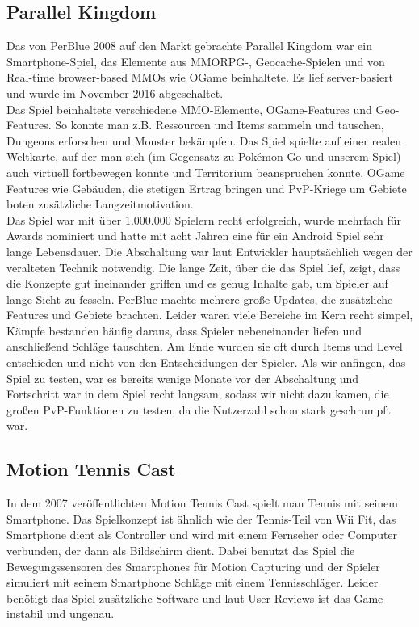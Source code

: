 \documentclass[extern,palatino]{cgBA}
\begin{document}
\subsection{Parallel Kingdom}
Das von PerBlue 2008 auf den Markt gebrachte Parallel Kingdom war ein Smartphone-Spiel, das Elemente aus MMORPG-, Geocache-Spielen und von Real-time browser-based MMOs wie OGame beinhaltete. Es lief server-basiert und wurde im November 2016 abgeschaltet. %
\\Das Spiel beinhaltete verschiedene MMO-Elemente, OGame-Features und Geo-Features. So konnte man z.B. Ressourcen und Items sammeln und tauschen, Dungeons erforschen und Monster bekämpfen. Das Spiel spielte  auf einer realen Weltkarte, auf der man sich (im Gegensatz zu Pokémon Go und unserem Spiel) auch virtuell fortbewegen konnte und Territorium beanspruchen konnte. OGame Features wie Gebäuden, die stetigen Ertrag bringen und PvP-Kriege um Gebiete boten zusätzliche Langzeitmotivation.
\\Das Spiel war mit über 1.000.000 Spielern recht erfolgreich, wurde mehrfach für Awards nominiert und hatte mit acht Jahren eine für ein Android Spiel sehr lange Lebensdauer.  %
Die Abschaltung war laut Entwickler hauptsächlich wegen der veralteten Technik notwendig. %
Die lange Zeit, über die das Spiel lief, zeigt, dass die Konzepte gut ineinander griffen und es genug Inhalte gab, um Spieler auf lange Sicht zu fesseln. PerBlue machte mehrere große Updates, die zusätzliche Features und Gebiete brachten. Leider waren viele Bereiche im Kern recht simpel, Kämpfe bestanden häufig daraus, dass Spieler nebeneinander liefen und anschließend Schläge tauschten. Am Ende wurden sie oft durch Items und Level entschieden und nicht von den Entscheidungen der Spieler. Als wir anfingen, das Spiel zu testen, war es bereits wenige Monate vor der Abschaltung und Fortschritt war in dem Spiel recht langsam, sodass wir nicht dazu kamen, die großen PvP-Funktionen zu testen, da die Nutzerzahl schon stark geschrumpft war.
\subsection{Motion Tennis Cast}
In dem 2007 veröffentlichten Motion Tennis Cast spielt man Tennis mit seinem Smartphone. Das Spielkonzept ist ähnlich wie der Tennis-Teil von Wii Fit, das Smartphone dient als Controller und wird mit einem Fernseher oder Computer verbunden, der dann als Bildschirm dient. Dabei benutzt das Spiel die Bewegungssensoren des Smartphones für Motion Capturing und der Spieler simuliert mit seinem Smartphone Schläge mit einem Tennisschläger. Leider benötigt das Spiel zusätzliche Software und laut User-Reviews ist das Game instabil und ungenau.
\newpage
\end{document}
